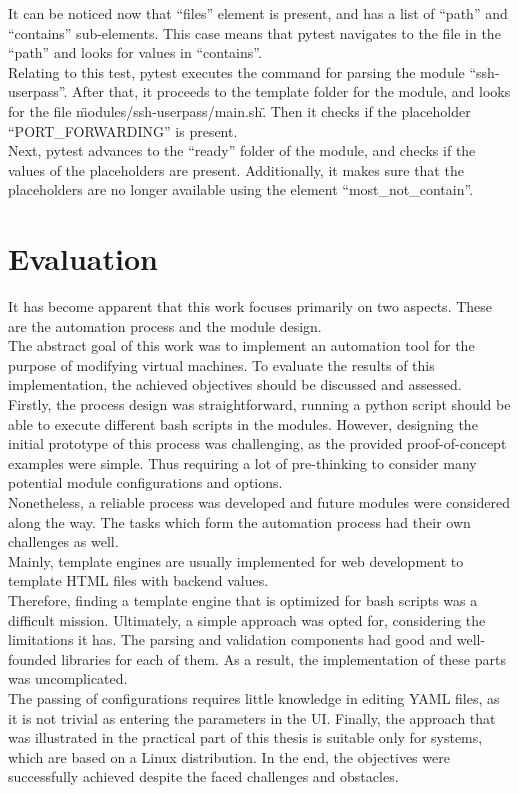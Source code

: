 It can be noticed now that “files” element is present, and has a list of “path” and “contains” sub-elements. This case means that pytest navigates to the file in the “path” and looks for values in “contains”.\\
Relating to this test, pytest executes the command for parsing the module “ssh-userpass”. After that, it proceeds to the template folder for the module, and looks for the file \"modules/ssh-userpass/main.sh\". Then it checks if the placeholder “PORT\_FORWARDING” is present.\\
Next, pytest advances to the “ready” folder of the module, and checks if the values of the placeholders are present. Additionally, it makes sure that the placeholders are no longer available using the element “most\_not\_contain”.\\


\section{Evaluation}
It has become apparent that this work focuses primarily on two aspects. These are the automation process and the module design.\\
The abstract goal of this work was to implement an automation tool for the purpose of modifying virtual machines. To evaluate the results of this implementation, the achieved objectives should be discussed and assessed.\\
Firstly, the process design was straightforward, running a python script should be able to execute different bash scripts in the modules. However, designing the initial prototype of this process was challenging, as the provided proof-of-concept examples were simple. Thus requiring a lot of pre-thinking to consider many potential module configurations and options.\\
Nonetheless, a reliable process was developed and future modules were considered along the way. The tasks which form the automation process had their own challenges as well.\\
Mainly, template engines are usually implemented for web development to template HTML files with backend values.\\ Therefore, finding a template engine that is optimized for bash scripts was a difficult mission. Ultimately, a simple approach was opted for, considering the limitations it has.
The parsing and validation components had good and well-founded libraries for each of them. As a result, the implementation of these parts was uncomplicated.\\
The passing of configurations requires little knowledge in editing YAML files, as it is not trivial as entering the parameters in the UI. Finally, the approach that was illustrated in the practical part of this thesis is suitable only for systems, which are based on a Linux distribution.
In the end, the objectives were successfully achieved despite the faced challenges and obstacles.
